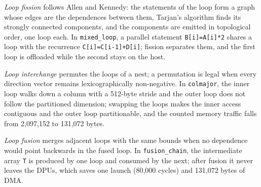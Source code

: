 \documentclass{ieeeaccess}
\begin{document}
\emph{Loop fission} follows Allen and Kennedy: the statements of the loop form a graph whose edges are the dependences between them, Tarjan's algorithm finds its strongly connected components, and the components are emitted in topological order, one loop each. In \texttt{mixed\_loop}, a parallel statement \texttt{B[i]=A[i]*2} shares a loop with the recurrence \texttt{C[i]=C[i-1]+D[i]}; fission separates them, and the first loop is offloaded while the second stays on the host.

\emph{Loop interchange} permutes the loops of a nest; a permutation is legal when every direction vector remains lexicographically non-negative. In \texttt{colmajor}, the inner loop walks down a column with a 512-byte stride and the outer loop does not follow the partitioned dimension; swapping the loops makes the inner access contiguous and the outer loop partitionable, and the counted memory traffic falls from 2,097,152 to 131,072 bytes.

\emph{Loop fusion} merges adjacent loops with the same bounds when no dependence would point backwards in the fused loop. In \texttt{fusion\_chain}, the intermediate array \texttt{T} is produced by one loop and consumed by the next; after fusion it never leaves the DPUs, which saves one launch (80,000 cycles) and 131,072 bytes of DMA.
\end{document}

